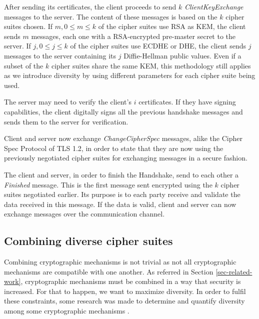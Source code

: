 \documentclass{sig-alternate-05-2015}
\begin{document}
After sending its certificates, the client proceeds to send $k$ \textit{ClientKeyExchange} messages to the server. The content of these messages is based on the $k$ cipher suites chosen. If $m, 0 \leq m \leq k$ of the cipher suites use RSA as KEM, the client sends $m$ messages, each one with a RSA-encrypted pre-master secret to the server. If $j, 0 \leq j \leq k$ of the cipher suites use ECDHE or DHE, the client sends $j$ messages to the server containing its $j$ Diffie-Hellman public values. Even if a subset of the $k$ cipher suites share the same KEM, this methodology still applies as we introduce diversity by using different parameters for each cipher suite being used.

The server may need to verify the client's $i$ certificates. If they have signing capabilities, the client digitally signs all the previous handshake messages and sends them to the server for verification.

Client and server now exchange \textit{ChangeCipherSpec} messages, alike the Cipher Spec Protocol of TLS 1.2, in order to state that they are now using the previously negotiated cipher suites for exchanging messages in a secure fashion.

The client and server, in order to finish the Handshake, send to each other a \textit{Finished} message. This is the first message sent encrypted using the $k$ cipher suites negotiated earlier. Its purpose is to each party receive and validate the data received in this message. If the data is valid, client and server can now exchange messages over the communication channel.

\subsection{Combining diverse cipher suites}

Combining cryptographic mechanisms is not trivial as not all cryptographic mechanisms are compatible with one another. As referred in Section \ref{sec-related-work}, cryptographic mechanisms must be combined in a way that security is increased. For that to happen, we want to maximize diversity.
In order to fulfil these constraints, some research was made to determine and quantify diversity among some cryptographic mechanisms \cite{CarvalhoThesis14}.
\end{document}

